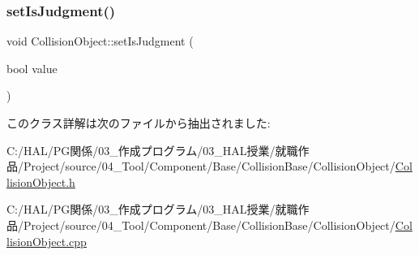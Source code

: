 \mbox{\label{class_collision_object_a3000144caea71e39cbdafebb249fef7e}} 
\subsubsection{\texorpdfstring{set\+Is\+Judgment()}{setIsJudgment()}}
{\footnotesize\ttfamily void Collision\+Object\+::set\+Is\+Judgment (\begin{DoxyParamCaption}\item[{bool}]{value }\end{DoxyParamCaption})\hspace{0.3cm}{\ttfamily [inline]}}



このクラス詳解は次のファイルから抽出されました\+:\begin{DoxyCompactItemize}
\item 
C\+:/\+H\+A\+L/\+P\+G関係/03\+\_\+作成プログラム/03\+\_\+\+H\+A\+L授業/就職作品/\+Project/source/04\+\_\+\+Tool/\+Component/\+Base/\+Collision\+Base/\+Collision\+Object/\mbox{\hyperlink{_collision_object_8h}{Collision\+Object.\+h}}\item 
C\+:/\+H\+A\+L/\+P\+G関係/03\+\_\+作成プログラム/03\+\_\+\+H\+A\+L授業/就職作品/\+Project/source/04\+\_\+\+Tool/\+Component/\+Base/\+Collision\+Base/\+Collision\+Object/\mbox{\hyperlink{_collision_object_8cpp}{Collision\+Object.\+cpp}}\end{DoxyCompactItemize}
